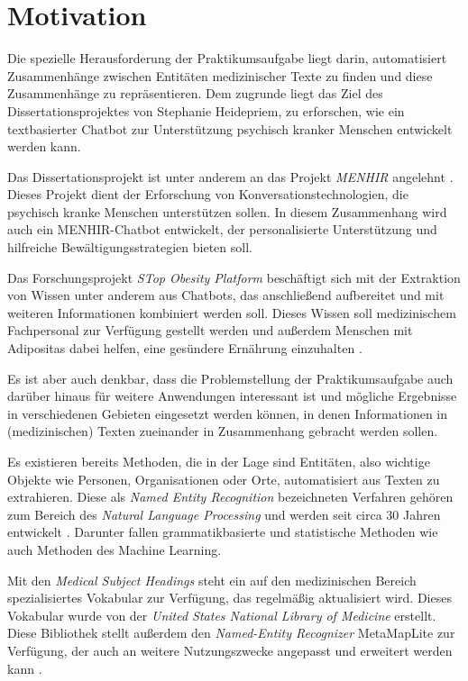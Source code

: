 \section{Motivation}

Die spezielle Herausforderung der Praktikumsaufgabe liegt darin, automatisiert Zusammenhänge zwischen Entitäten medizinischer Texte zu finden und diese Zusammenhänge zu repräsentieren. Dem zugrunde liegt das Ziel des Dissertationsprojektes von Stephanie Heidepriem, zu erforschen, wie ein textbasierter Chatbot zur Unterstützung 
psychisch kranker Menschen entwickelt werden kann. 

Das Dissertationsprojekt  ist unter anderem an das Projekt \emph{MENHIR} angelehnt \cite{menhir}. Dieses Projekt dient der Erforschung von Konversationstechnologien, die psychisch kranke Menschen unterstützen sollen. In diesem Zusammenhang wird auch 
ein MENHIR-Chatbot entwickelt, der personalisierte Unterstützung und hilfreiche Bewältigungsstrategien bieten soll. 

Das Forschungsprojekt \emph{STop Obesity Platform} beschäftigt sich mit der Extraktion von Wissen unter anderem aus Chatbots, das anschließend aufbereitet und mit weiteren Informationen kombiniert werden soll. Dieses Wissen soll medizinischem Fachpersonal zur Verfügung gestellt werden und außerdem Menschen mit Adipositas dabei helfen, eine gesündere Ernährung einzuhalten \cite{stopobesity}.


Es ist aber auch denkbar, dass die Problemstellung der Praktikumsaufgabe auch darüber hinaus für weitere Anwendungen interessant ist und mögliche Ergebnisse in verschiedenen Gebieten eingesetzt werden können, in denen Informationen in (medizinischen) Texten zueinander in Zusammenhang gebracht werden sollen.

Es existieren bereits Methoden, die in der Lage sind Entitäten, also wichtige Objekte wie Personen, Organisationen oder Orte, automatisiert aus Texten zu extrahieren. Diese als \emph{Named Entity Recognition} bezeichneten Verfahren gehören zum Bereich des \emph{Natural Language Processing} und werden seit circa 30 Jahren entwickelt \cite{trends_in_ner}. Darunter fallen grammatikbasierte und statistische Methoden wie auch Methoden des Machine Learning.

Mit den \emph{Medical Subject Headings} \cite{mesh} steht ein auf den medizinischen Bereich spezialisiertes Vokabular zur Verfügung, das regelmäßig aktualisiert wird. Dieses Vokabular wurde von der \emph{United States National Library of Medicine} erstellt. Diese Bibliothek stellt außerdem den \emph{Named-Entity Recognizer}
\glqq MetaMapLite\grqq{} zur Verfügung, der auch an weitere Nutzungszwecke angepasst und erweitert werden kann \cite{metamaplite}. 

